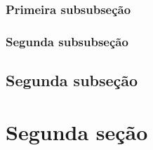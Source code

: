 \documentclass[a4paper,12pt,oneside,onecolumn]{uerj/uerj}
\begin{document}
\subsubsection{Primeira subsubseção}

\subsubsection{Segunda subsubseção}

\subsection{Segunda subseção}

\section{Segunda seção}


\printindex
\end{document}
